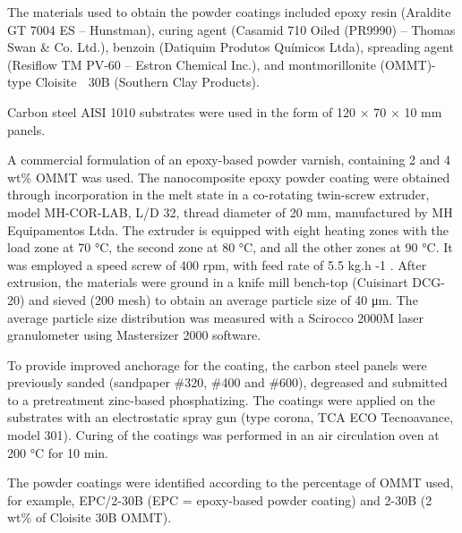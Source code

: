 \begin{multicols}{2}


\par{}The materials used to obtain the powder coatings
included epoxy resin (Araldite GT 7004 ES – Hunstman),
curing agent (Casamid 710 Oiled (PR9990) – Thomas Swan
\& Co. Ltd.), benzoin (Datiquim Produtos Químicos Ltda),
spreading agent (Resiflow TM PV-60 – Estron Chemical Inc.),
and montmorillonite (OMMT)-type Cloisite  30B (Southern
Clay Products).
\par{}Carbon steel AISI 1010 substrates were used in the form
of 120 × 70 × 10 mm panels.


\par{}A commercial formulation of an epoxy-based powder
varnish, containing 2 and 4 wt\% OMMT was used.
The nanocomposite epoxy powder coating were obtained
through incorporation in the melt state in a co-rotating
twin-screw extruder, model MH-COR-LAB, L/D 32, thread
diameter of 20 mm, manufactured by MH Equipamentos
Ltda. The extruder is equipped with eight heating zones
with the load zone at 70 °C, the second zone at 80 °C, and
all the other zones at 90 °C. It was employed a speed screw
of 400 rpm, with feed rate of 5.5 kg.h -1 . After extrusion, the
materials were ground in a knife mill bench-top (Cuisinart
DCG-20) and sieved (200 mesh) to obtain an average particle
size of 40 μm. The average particle size distribution was
measured with a Scirocco 2000M laser granulometer using
Mastersizer 2000 software.
\par{}To provide improved anchorage for the coating, the
carbon steel panels were previously sanded (sandpaper \#320,
\#400 and \#600), degreased and submitted to a pretreatment
zinc-based phosphatizing. The coatings were applied on
the substrates with an electrostatic spray gun (type corona,
TCA ECO Tecnoavance, model 301). Curing of the coatings
was performed in an air circulation oven at 200 °C for 10 min.
\par{}The powder coatings were identified according to
the percentage of OMMT used, for example, EPC/2-30B
(EPC = epoxy-based powder coating) and 2-30B
(2 wt\% of Cloisite 30B OMMT).



\end{multicols}
